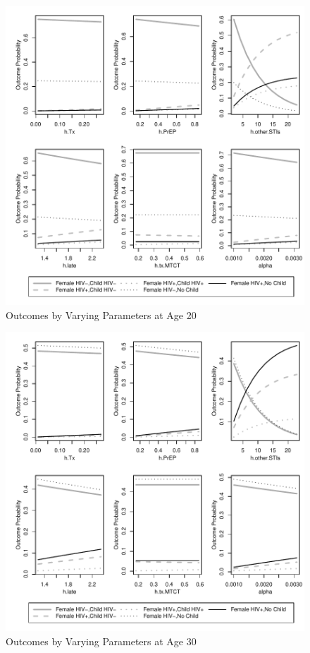 \documentclass[11pt]{nih_mod}
\begin{document}
\begin{figure}[H]
  \begin{center}
    \includegraphics[width=7in]{figures/OnlyVaryParam_Age20_06Sept2012.pdf}
  \end{center}
  \caption{Outcomes by Varying Parameters at Age 20}
  \label{Fig:Vary20}
\end{figure}

\begin{figure}[H]
  \begin{center}
    \includegraphics[width=7in]{figures/OnlyVaryParam_Age30_06Sept2012.pdf}
  \end{center}
  \caption{Outcomes by Varying Parameters at Age 30}
  \label{Fig:Vary30}
\end{figure}
\end{document}
